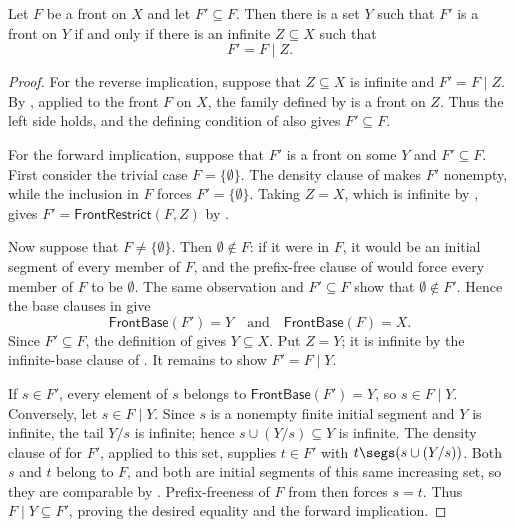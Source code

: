 \begin{lemma}
Let $F$ be a front on $X$ and let $F'\subseteq F$.  Then there is a set $Y$
such that $F'$ is a front on $Y$ if and only if there is an infinite
$Z\subseteq X$ such that
\[
F'=F\mathbin{|}Z.
\]
\end{lemma}
\begin{proof}
For the reverse implication, suppose that $Z\subseteq X$ is infinite and
$F'=F\mathbin{|}Z$.  By , applied to the front
$F$ on $X$, the family defined by  is a front on
$Z$.  Thus the left side holds, and the defining condition of
 also gives $F'\subseteq F$.

For the forward implication, suppose that $F'$ is a front on some $Y$ and
$F'\subseteq F$.  First consider the trivial case $F=\{\emptyset\}$.
The density clause of  makes $F'$ nonempty, while the
inclusion in $F$ forces $F'=\{\emptyset\}$.  Taking $Z=X$, which is
infinite by , gives
$F'=\mathsf{FrontRestrict}(F,Z)$ by .

Now suppose that $F\ne\{\emptyset\}$.  Then $\emptyset\notin F$: if it
were in $F$, it would be an initial segment of every member of $F$, and the
prefix-free clause of  would force every member of $F$ to be
$\emptyset$.  The same observation and $F'\subseteq F$ show that
$\emptyset\notin F'$.  Hence the base clauses in  give
\[
\mathsf{FrontBase}(F')=Y\quad\text{and}\quad
\mathsf{FrontBase}(F)=X.
\]
Since $F'\subseteq F$, the definition of  gives
$Y\subseteq X$.  Put $Z=Y$; it is infinite by the infinite-base clause of
.  It remains to show $F'=F\mathbin{|}Y$.

If $s\in F'$, every element of $s$ belongs to
$\mathsf{FrontBase}(F')=Y$, so $s\in F\mathbin{|}Y$.  Conversely, let
$s\in F\mathbin{|}Y$.  Since $s$ is a nonempty finite initial segment and
$Y$ is infinite, the tail $Y/s$ is infinite; hence
$s\cup(Y/s)\subseteq Y$ is infinite.  The density clause of
 for $F'$, applied to this set, supplies $t\in F'$ with
$t\segs(s\cup(Y/s))$.  Both $s$ and $t$ belong to $F$, and both are initial
segments of this same increasing set, so they are comparable by
.  Prefix-freeness of $F$ from 
then forces $s=t$.  Thus $F\mathbin{|}Y\subseteq F'$, proving the desired
equality and the forward implication.
\end{proof}
